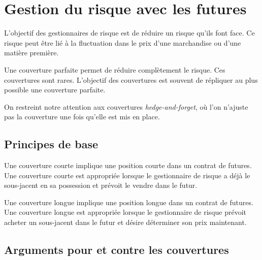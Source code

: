 \chapter{Gestion du risque avec les futures}

L'objectif des gestionnaires de risque est de réduire un risque qu'ils font face. Ce risque peut être lié à la fluctuation dans le prix d'une marchandise ou d'une matière première.

Une couverture parfaite permet de réduire complètement le risque. Ces couvertures sont rares. L'objectif des couvertures est souvent de répliquer au plus possible une couverture parfaite. 

On restreint notre attention aux couvertures \textit{hedge-and-forget}, où l'on n'ajuste pas la couverture une fois qu'elle est mis en place. 

\section{Principes de base}

Une couverture courte implique une position courte dans un contrat de futures. Une couverture courte est appropriée lorsque le gestionnaire de risque a déjà le sous-jacent en sa possession et prévoit le vendre dans le futur. 

Une couverture longue implique une position longue dans un contrat de futures. Une couverture longue est appropriée lorsque le gestionnaire de risque prévoit acheter un sous-jacent dans le futur et désire déterminer son prix maintenant. 

\section{Arguments pour et contre les couvertures}

